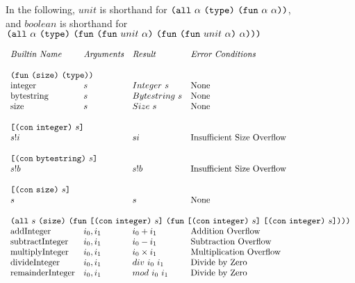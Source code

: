 \documentclass[../main.tex]{subfiles}
\begin{document}
\begin{figure*}[t]
    In the following, $unit$ is shorthand for \(\texttt{(} \texttt{all} ~ \alpha ~ \texttt{(} \texttt{type} \texttt{)}{} ~ \texttt{(} \texttt{fun} ~ \alpha ~ \alpha \texttt{)} \texttt{)}\), and $boolean$ is shorthand for \(\texttt{(} \texttt{all} ~ \alpha ~ \texttt{(} \texttt{type} \texttt{)}{} ~ \texttt{(} \texttt{fun} ~ \texttt{(} \texttt{fun} ~ unit ~ \alpha \texttt{)} ~ \texttt{(} \texttt{fun} ~ \texttt{(} \texttt{fun} ~ unit ~ \alpha \texttt{)} ~ \alpha \texttt{)} \texttt{)} \texttt{)}\)
    
    \centering
    \footnotesize
    
    \[\begin{array}{llll}
        \textit{Builtin Name}               & \textit{Arguments} & \textit{Result} & \textit{Error Conditions}\\
        &&\\
        
        \multicolumn{4}{l}{\funK{\sizeK{}}{\typeK{}}}\\
        \mathrm{integer} & s & Integer ~ s & \textrm{None}\\
        \mathrm{bytestring} & s & Bytestring ~ s & \textrm{None}\\
        \mathrm{size} & s & Size ~ s & \textrm{None}\\
        &&\\
        
        \multicolumn{4}{l}{
          \appT{\conT{\conIntegerType{}}}{s}}\\
        s!i & & si & \textrm{Insufficient Size Overflow}\\
        &&\\
        
        \multicolumn{4}{l}{
          \appT{\conT{\conBytestringType{}}}{s}}\\
        s!b & & s!b & \textrm{Insufficient Size Overflow}\\
        &&\\
        
        \multicolumn{4}{l}{
          \appT{\conT{\conSizeType{}}}{s}}\\
        s & & s & \textrm{None}\\
        &&\\
        
        \multicolumn{4}{l}{
          \allT{s}{\sizeK{}}{
            \funT{\appT{\conT{\conIntegerType{}}}{s}}
                 {\funT{\appT{\conT{\conIntegerType{}}}{s}}
                       {\appT{\conT{\conIntegerType{}}}{s}}}}}\\
        \mathrm{addInteger}                 &  i_0 , i_1   &   i_0 + i_1         &   \textrm{Addition Overflow}       \\
        \mathrm{subtractInteger}            &  i_0 , i_1   &   i_0 - i_1         &   \textrm{Subtraction Overflow}    \\
        \mathrm{multiplyInteger}            &  i_0 , i_1   &   i_0 \times i_1    &   \textrm{Multiplication Overflow} \\
        \mathrm{divideInteger}              &  i_0 , i_1   &   div ~ i_0 ~ i_1   &   \textrm{Divide by Zero}          \\
        \mathrm{remainderInteger}           &  i_0 , i_1   &   mod ~ i_0 ~ i_1   &   \textrm{Divide by Zero}          \\
        &&\\
        

\end{array}\]
\end{figure*}
\end{document}
